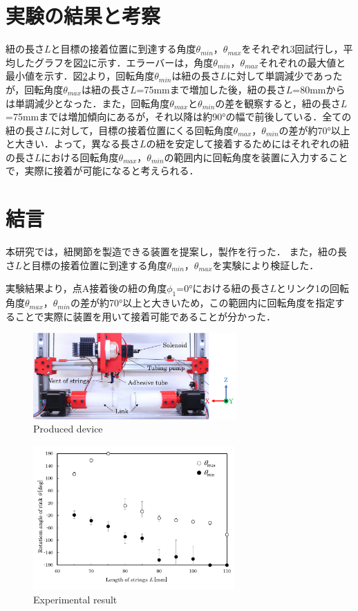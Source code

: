 \section{実験の結果と考察}
紐の長さ$L$と目標の接着位置に到達する角度$\theta_{min}$，$\theta_{max}$をそれぞれ3回試行し，平均したグラフを図\ref{実験結果}に示す．エラーバーは，角度$\theta_{min}$，$\theta_{max}$それぞれの最大値と最小値を示す．図\ref{実験結果}より，回転角度$\theta_{min}$は紐の長さ$L$に対して単調減少であったが，回転角度$\theta_{max}$は紐の長さ$L$=75mmまで増加した後，紐の長さ$L$=80mmからは単調減少となった．また，回転角度$\theta_{max}$と$\theta_{min}$の差を観察すると，紐の長さ$L$=75mmまでは増加傾向にあるが，それ以降は約90°の幅で前後している．全ての紐の長さ$L$に対して，目標の接着位置にくる回転角度$\theta_{max}$，$\theta_{min}$の差が約70°以上と大きい．よって，異なる長さ$L$の紐を安定して接着するためにはそれぞれの紐の長さ$L$における回転角度$\theta_{max}$，$\theta_{min}$の範囲内に回転角度を装置に入力することで，実際に接着が可能になると考えられる．

\section{結言}
本研究では，紐関節を製造できる装置を提案し，製作を行った． また，紐の長さ$L$と目標の接着位置に到達する角度$\theta_{min}$，$\theta_{max}$を実験により検証した．
\par
実験結果より，点A接着後の紐の角度$\phi_1$=0°における紐の長さ$L$とリンク1の回転角度$\theta_{max}$，$\theta_{min}$の差が約70°以上と大きいため，この範囲内に回転角度を指定することで実際に装置を用いて接着可能であることが分かった．

\begin{figure}[h]
  \centering
  \includegraphics[width=78mm]{figure/abst用接続装置}
  \caption{Produced device}
  \label{接続装置}
\end{figure}

\begin{figure}[h]
  \centering
  \includegraphics[width=77mm]{figure/実験結果}
  \caption{Experimental result}
  \label{実験結果}
\end{figure}
